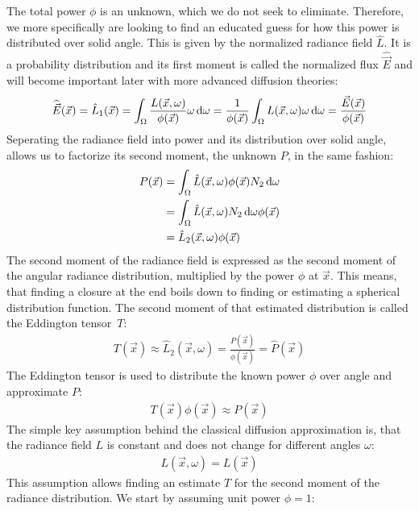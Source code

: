 The total power $\phi$ is an unknown, which we do not seek to eliminate. Therefore, we more specifically are looking to find an educated guess for how this power is distributed over solid angle. This is given by the normalized radiance field $\hat{L}$. It is a probability distribution and its first moment is called the normalized flux $\widehat{\vec{E}}$ and will become important later with more advanced diffusion theories:
\begin{align*}
\widehat{\vec{E}}(\vec{x}) = \hat{L}_1(\vec{x}) = \int_{\Omega}\frac{L(\vec{x}, \omega)}{\phi(\vec{x})}\omega\,\mathrm{d}\omega = \frac{1}{\phi(\vec{x})}\int_{\Omega}L(\vec{x}, \omega)\omega\,\mathrm{d}\omega = \frac{\vec{E}(\vec{x})}{\phi(\vec{x})}
\end{align*}
Seperating the radiance field into power and its distribution over solid angle, allows us to factorize its second moment, the unknown $P$, in the same fashion:
\begin{align*}
P(\vec{x}) &=
\int_{\Omega}{\hat{L}(\vec{x}, \omega)\phi(\vec{x})N_2\,\mathrm{d}\omega}\\
&= \int_{\Omega}{\hat{L}(\vec{x}, \omega)N_2\,\mathrm{d}\omega}\phi(\vec{x})\\
&= \hat{L}_2(\vec{x}, \omega)\phi(\vec{x})
\end{align*}
The second moment of the radiance field is expressed as the second moment of the angular radiance distribution, multiplied by the power $\phi$ at $\vec{x}$. This means, that finding a closure at the end boils down to finding or estimating a spherical distribution function. The second moment of that estimated distribution is called the Eddington tensor~$T$:
\begin{align}
\label{eq:eddington_tensor}
T(\vec{x}) \approx \hat{L}_2(\vec{x}, \omega) =
\frac{P(\vec{x})}{\phi(\vec{x})} =
\widehat{P}(\vec{x})
\end{align}
The Eddington tensor is used to distribute the known power $\phi$ over angle and approximate $P$:
\begin{align*}
T(\vec{x})\phi(\vec{x}) \approx 
P(\vec{x})
\end{align*}
The simple key assumption behind the classical diffusion approximation is, that the radiance field $L$ is constant and does not change for different angles $\omega$:
\begin{align*}
L(\vec{x}, \omega) = L(\vec{x})
\end{align*}
This assumption allows finding an estimate $T$ for the second moment of the radiance distribution. We start by assuming unit power $\phi = 1$:

